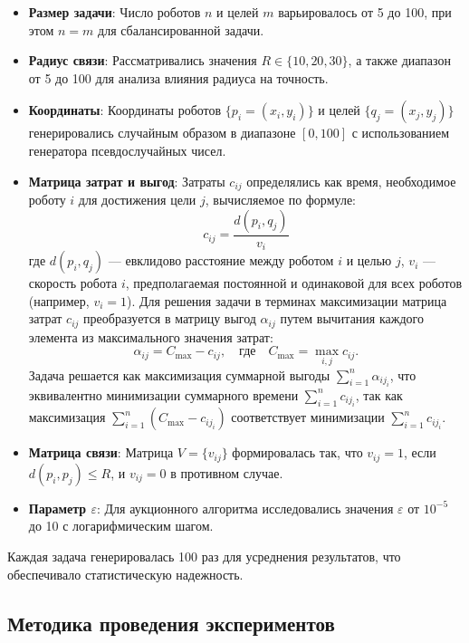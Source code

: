 \begin{itemize}
    \item \textbf{Размер задачи}: Число роботов \( n \) и целей \( m \) варьировалось от 5 до 100, при этом \( n = m \) для сбалансированной задачи.
    \item \textbf{Радиус связи}: Рассматривались значения \( R \in \{10, 20, 30\} \), а также диапазон от 5 до 100 для анализа влияния радиуса на точность.
    \item \textbf{Координаты}: Координаты роботов \( \{p_i = (x_i, y_i)\} \) и целей \( \{q_j = (x_j, y_j)\} \) генерировались случайным образом в диапазоне \( [0, 100] \) с использованием генератора псевдослучайных чисел.
     \item \textbf{Матрица затрат и выгод}: Затраты \( c_{ij} \) определялись как время, необходимое роботу \( i \) для достижения цели \( j \), вычисляемое по формуле:
    \[
    c_{ij} = \frac{d(p_i, q_j)}{v_i}
    \]
    где \( d(p_i, q_j) \) --- евклидово расстояние между роботом \( i \) и целью \( j \), \( v_i \) --- скорость робота \( i \), предполагаемая постоянной и одинаковой для всех роботов (например, \( v_i = 1 \)). Для решения задачи в терминах максимизации матрица затрат \( c_{ij} \) преобразуется в матрицу выгод \( \alpha_{ij} \) путем вычитания каждого элемента из максимального значения затрат:
    \[
    \alpha_{ij} = C_{\text{max}} - c_{ij}, \quad \text{где} \quad C_{\text{max}} = \max_{i,j} c_{ij}.
    \]
    Задача решается как максимизация суммарной выгоды \( \sum_{i=1}^n \alpha_{i j_i} \), что эквивалентно минимизации суммарного времени \( \sum_{i=1}^n c_{i j_i} \), так как максимизация \( \sum_{i=1}^n (C_{\text{max}} - c_{i j_i}) \) соответствует минимизации \( \sum_{i=1}^n c_{i j_i} \).
    \item \textbf{Матрица связи}: Матрица \( V = \{v_{ij}\} \) формировалась так, что \( v_{ij} = 1 \), если \( d(p_i, p_j) \leq R \), и \( v_{ij} = 0 \) в противном случае.
    \item \textbf{Параметр \( \varepsilon \)}: Для аукционного алгоритма исследовались значения \( \varepsilon \) от \( 10^{-5} \) до 10 с логарифмическим шагом.
\end{itemize}

Каждая задача генерировалась 100 раз для усреднения результатов, что обеспечивало статистическую надежность.

\subsection{Методика проведения экспериментов}

